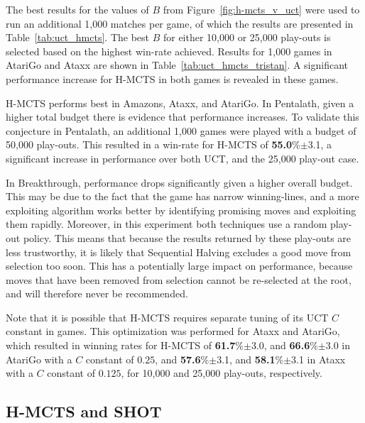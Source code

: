 \documentclass{kecsmstr}
\begin{document}
The best results for the values of $B$ from Figure~\ref{fig:h-mcts_v_uct} were used to run an additional 1,000 matches per game, of which the results are presented in Table~\ref{tab:uct_hmcts}. The best $B$ for either 10,000 or 25,000 play-outs is selected based on the highest win-rate achieved. Results for 1,000 games in AtariGo and Ataxx are shown in Table~\ref{tab:uct_hmcts_tristan}. A significant performance increase for H-MCTS in both games is revealed in these games. 

H-MCTS performs best in Amazons, Ataxx, and AtariGo. In Pentalath, given a higher total budget there is evidence that performance increases. To validate this conjecture in Pentalath, an additional 1,000 games were played with a budget of 50,000 play-outs. This resulted in a win-rate for H-MCTS of {\bf{55.0}}\%$\pm$3.1, a significant increase in performance over both UCT, and the 25,000 play-out case.

In Breakthrough, performance drops significantly given a higher overall budget. This may be due to the fact that the game has narrow winning-lines, and a more exploiting algorithm works better by identifying promising moves and exploiting them rapidly. Moreover, in this experiment both techniques use a random play-out policy. This means that because the results returned by these play-outs are less trustworthy, it is likely that Sequential Halving excludes a good move from selection too soon. This has a potentially large impact on performance, because moves that have been removed from selection cannot be re-selected at the root, and will therefore never be recommended.

Note that it is possible that H-MCTS requires separate tuning of its UCT $C$ constant in games. This optimization was performed for Ataxx and AtariGo, which resulted in winning rates for H-MCTS of {\bf{61.7}}\%$\pm$3.0, and {\bf{66.6}}\%$\pm$3.0 in AtariGo with a $C$ constant of $0.25$, and {\bf{57.6}}\%$\pm$3.1, and {\bf{58.1}}\%$\pm$3.1 in Ataxx with a $C$ constant of $0.125$, for 10,000 and 25,000 play-outs, respectively.

\subsection{H-MCTS and SHOT}
\label{subsec:hmcts_shot}
\end{document}
